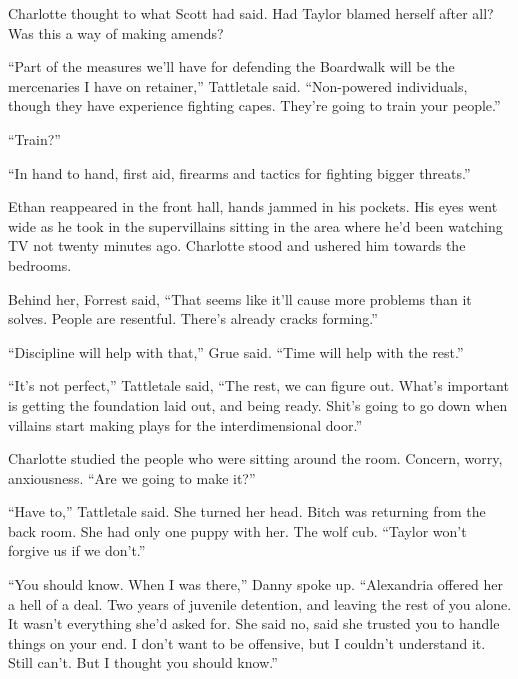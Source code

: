 Charlotte thought to what Scott had said.  Had Taylor blamed herself after all?  Was this a way of making amends?



``Part of the measures we'll have for defending the Boardwalk will be the mercenaries I have on retainer,'' Tattletale said.  ``Non-powered individuals, though they have experience fighting capes.  They're going to train your people.''



``Train?''



``In hand to hand, first aid, firearms and tactics for fighting bigger threats.''



Ethan reappeared in the front hall, hands jammed in his pockets.  His eyes went wide as he took in the supervillains sitting in the area where he'd been watching TV not twenty minutes ago.  Charlotte stood and ushered him towards the bedrooms.



Behind her, Forrest said, ``That seems like it'll cause more problems than it solves.  People are resentful.  There's already cracks forming.''



``Discipline will help with that,'' Grue said.  ``Time will help with the rest.''



``It's not perfect,'' Tattletale said, ``The rest, we can figure out.  What's important is getting the foundation laid out, and being ready.  Shit's going to go down when villains start making plays for the interdimensional door.''



Charlotte studied the people who were sitting around the room.  Concern, worry, anxiousness.  ``Are we going to make it?''



``Have to,'' Tattletale said.  She turned her head.  Bitch was returning from the back room.  She had only one puppy with her.  The wolf cub.  ``Taylor won't forgive us if we don't.''



``You should know.  When I was there,'' Danny spoke up.  ``Alexandria offered her a hell of a deal.  Two years of juvenile detention, and leaving the rest of you alone.  It wasn't everything she'd asked for.  She said no, said she trusted you to handle things on your end.  I don't want to be offensive, but I couldn't understand it.  Still can't.  But I thought you should know.''



